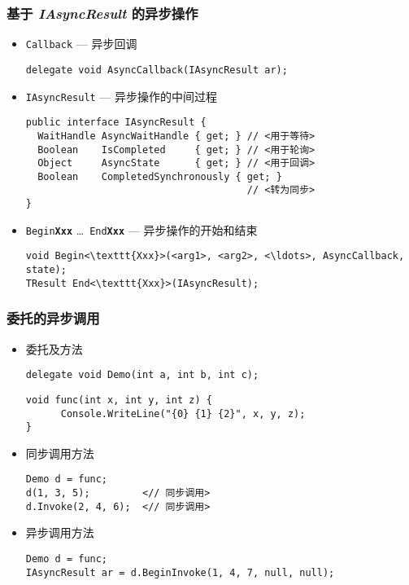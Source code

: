 \begin{frame}[fragile]
\frametitle{基于 \textit{IAsyncResult} 的异步操作}

\begin{itemize}
\item \texttt{Callback} --- 异步回调
\begin{lstlisting}
delegate void AsyncCallback(IAsyncResult ar);
\end{lstlisting}
\item \texttt{IAsyncResult} --- 异步操作的中间过程
\begin{lstlisting}[escapeinside=<>]
public interface IAsyncResult {
  WaitHandle AsyncWaitHandle { get; } // <用于等待>
  Boolean    IsCompleted     { get; } // <用于轮询>
  Object     AsyncState      { get; } // <用于回调>
  Boolean    CompletedSynchronously { get; }
                                      // <转为同步>
}
\end{lstlisting}
\item \texttt{Begin\textbf{Xxx}} \ldots\ \texttt{End\textbf{Xxx}} --- 异步操作的开始和结束
\begin{lstlisting}[escapeinside=<>]
void Begin<\texttt{Xxx}>(<arg1>, <arg2>, <\ldots>, AsyncCallback, state);
TResult End<\texttt{Xxx}>(IAsyncResult);
\end{lstlisting}
\end{itemize}
\end{frame}


\begin{frame}[fragile]
\frametitle{委托的异步调用}

\begin{itemize}
\item 委托及方法
\begin{lstlisting}
delegate void Demo(int a, int b, int c);
\end{lstlisting}
\begin{lstlisting}
void func(int x, int y, int z) {
      Console.WriteLine("{0} {1} {2}", x, y, z);
}
\end{lstlisting}
\item 同步调用方法
\begin{lstlisting}[escapeinside=<>]
Demo d = func;
d(1, 3, 5);         <// 同步调用>
d.Invoke(2, 4, 6);  <// 同步调用>
\end{lstlisting}
\item 异步调用方法
\begin{lstlisting}[escapeinside=<>]
Demo d = func;
IAsyncResult ar = d.BeginInvoke(1, 4, 7, null, null);
\end{lstlisting}
\end{itemize}
\end{frame}


